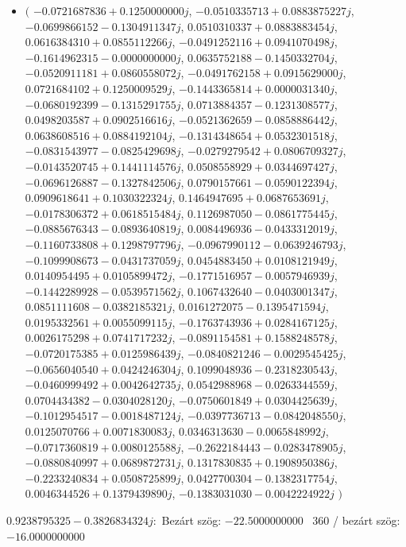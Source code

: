 \documentclass[14pt,a4paper]{article}
\begin{document}
\begin{itemize}
\item
$\big($
$-0.0721687836+0.1250000000j$, $-0.0510335713+0.0883875227j$, $-0.0699866152-0.1304911347j$, $0.0510310337+0.0883883454j$, $0.0616384310+0.0855112266j$, $-0.0491252116+0.0941070498j$, $-0.1614962315-0.0000000000j$, $0.0635752188-0.1450332704j$, $-0.0520911181+0.0860558072j$, $-0.0491762158+0.0915629000j$, $0.0721684102+0.1250009529j$, $-0.1443365814+0.0000031340j$, $-0.0680192399-0.1315291755j$, $0.0713884357-0.1231308577j$, $0.0498203587+0.0902516616j$, $-0.0521362659-0.0858886442j$, $0.0638608516+0.0884192104j$, $-0.1314348654+0.0532301518j$, $-0.0831543977-0.0825429698j$, $-0.0279279542+0.0806709327j$, $-0.0143520745+0.1441114576j$, $0.0508558929+0.0344697427j$, $-0.0696126887-0.1327842506j$, $0.0790157661-0.0590122394j$, $0.0909618641+0.1030322324j$, $0.1464947695+0.0687653691j$, $-0.0178306372+0.0618515484j$, $0.1126987050-0.0861775445j$, $-0.0885676343-0.0893640819j$, $0.0084496936-0.0433312019j$, $-0.1160733808+0.1298797796j$, $-0.0967990112-0.0639246793j$, $-0.1099908673-0.0431737059j$, $0.0454883450+0.0108121949j$, $0.0140954495+0.0105899472j$, $-0.1771516957-0.0057946939j$, $-0.1442289928-0.0539571562j$, $0.1067432640-0.0403001347j$, $0.0851111608-0.0382185321j$, $0.0161272075-0.1395471594j$, $0.0195332561+0.0055099115j$, $-0.1763743936+0.0284167125j$, $0.0026175298+0.0741717232j$, $-0.0891154581+0.1588248578j$, $-0.0720175385+0.0125986439j$, $-0.0840821246-0.0029545425j$, $-0.0656040540+0.0424246304j$, $0.1099048936-0.2318230543j$, $-0.0460999492+0.0042642735j$, $0.0542988968-0.0263344559j$, $0.0704434382-0.0304028120j$, $-0.0750601849+0.0304425639j$, $-0.1012954517-0.0018487124j$, $-0.0397736713-0.0842048550j$, $0.0125070766+0.0071830083j$, $0.0346313630-0.0065848992j$, $-0.0717360819+0.0080125588j$, $-0.2622184443-0.0283478905j$, $-0.0880840997+0.0689872731j$, $0.1317830835+0.1908950386j$, $-0.2233240834+0.0508725899j$, $0.0427700304-0.1382317754j$, $0.0046344526+0.1379439890j$, $-0.1383031030-0.0042224922j$
$\big)$
\end{itemize}
$0.9238795325-0.3826834324j$:\
Bezárt szög: $-22.5000000000$ \
360 / bezárt szög: $-16.0000000000$\
\end{document}
